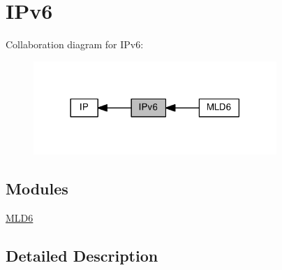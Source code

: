 \hypertarget{group__ip6}{}\section{I\+Pv6}
\label{group__ip6}
Collaboration diagram for I\+Pv6\+:
\nopagebreak
\begin{figure}[H]
\begin{center}
\leavevmode
\includegraphics[width=261pt]{group__ip6}
\end{center}
\end{figure}
\subsection*{Modules}
\begin{DoxyCompactItemize}
\item 
\hyperlink{group__mld6}{M\+L\+D6}
\end{DoxyCompactItemize}


\subsection{Detailed Description}
